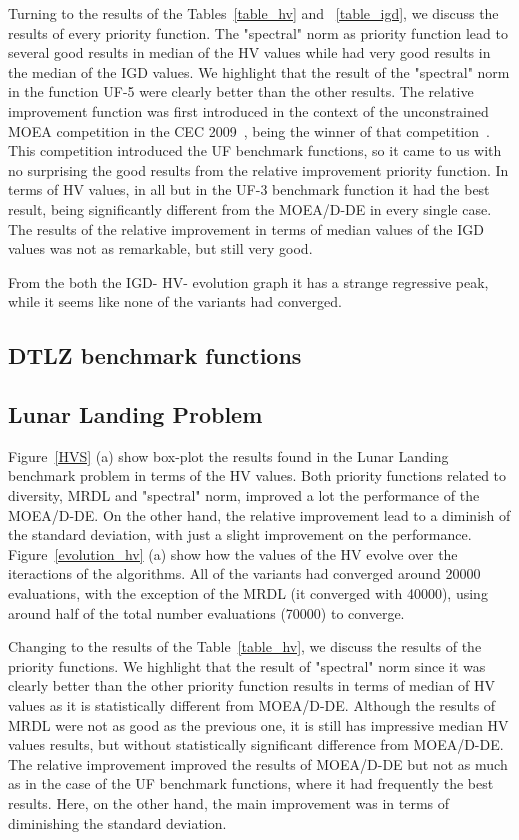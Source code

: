 Turning to the results of the Tables~\ref{table_hv} and ~\ref{table_igd}, we discuss the results of every priority function. The "spectral" norm as priority function lead to several good results in median of the HV values while had very good results in the median of the IGD values. We highlight that the result of the "spectral" norm in the function UF-5 were clearly better than the other results. The relative improvement function was first introduced in the context of the unconstrained MOEA competition in the CEC 2009~\cite{zhang2009performance}, being the winner of that competition~\cite{zhang2008multiobjective}. This competition introduced the UF benchmark functions, so it came to us with no surprising the good results from the relative improvement priority function. In terms of HV values, in all but in the UF-3 benchmark function it had the best result, being significantly different from the MOEA/D-DE in every single case. The results of the relative improvement in terms of median values of the IGD values was not as remarkable, but still very good.



 From the both the IGD- HV- evolution graph it has a strange regressive peak, while it seems like none of the variants had converged.

\subsection{DTLZ benchmark functions}



\subsection{Lunar Landing Problem}


Figure~\ref{HVS} (a) show box-plot the results found in the Lunar Landing  benchmark problem in terms of the HV values. Both priority functions related to diversity, MRDL and "spectral" norm, improved a lot the performance of the MOEA/D-DE. On the other hand, the relative improvement lead to a diminish of the standard deviation, with just a slight improvement on the performance.  Figure~\ref{evolution_hv} (a) show how the values of the HV evolve over the iteractions of the algorithms. All of the variants had converged around 20000 evaluations, with the exception of the MRDL (it converged with 40000), using around half of the total number evaluations (70000) to converge.

Changing to the results of the Table~\ref{table_hv}, we discuss the results of the priority functions.  We highlight that the result of "spectral" norm since it was clearly better than the other priority function results in terms of median of HV values as it is statistically different from MOEA/D-DE. Although the results of MRDL were not as good as the previous one, it is still has impressive median HV values results, but without statistically significant difference from MOEA/D-DE. The relative improvement improved the results of MOEA/D-DE but not as much as in the case of the UF benchmark functions, where it had frequently the best results. Here, on the other hand, the main improvement was in terms of diminishing the standard deviation.

